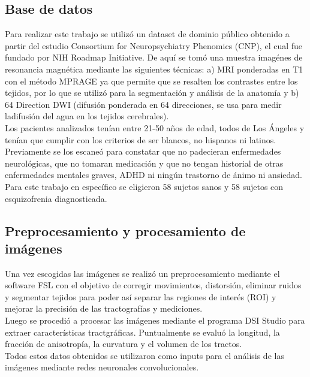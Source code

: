 \subsection{Base de datos}
Para realizar este trabajo se utilizó un dataset de dominio público obtenido a partir del estudio 
Consortium for Neuropsychiatry Phenomics (CNP), el cual fue fundado por NIH Roadmap Initiative. 
De aquí se tomó una muestra imagénes de resonancia magnética mediante las siguientes técnicas: 
a) MRI ponderadas en T1 con el método MPRAGE ya que permite que se resalten los contrastes entre los tejidos, 
por lo que se utilizó para la segmentación y análisis de la anatomía y 
b) 64 Direction DWI (difusión ponderada en 64 direcciones, se usa para medir ladifusión del agua 
en los tejidos cerebrales). \cite{bilder2020ucla}
\\
Los pacientes analizados tenían entre 21-50 años de edad, todos de Los Ángeles y tenían que cumplir 
con los criterios de ser blancos, no hispanos ni latinos. Previamente se los escaneó para constatar 
que no padecieran enfermedades neurológicas, que no tomaran medicación y que no tengan historial de 
otras enfermedades mentales graves, ADHD ni ningún trastorno de ánimo ni ansiedad. \\
Para este trabajo en específico se eligieron 58 sujetos sanos y 58 sujetos con esquizofrenia diagnosticada.

\subsection{Preprocesamiento y procesamiento de imágenes}
Una vez escogidas las imágenes se realizó un preprocesamiento mediante el software FSL con el objetivo de 
corregir movimientos, distorsión, eliminar ruidos y segmentar tejidos para poder así separar las regiones 
de interés (ROI) y mejorar la precisión de las tractografías y mediciones.\\
Luego se procedió a procesar las imágenes mediante el programa DSI Studio para extraer características 
tractgráficas. Puntualmente se evaluó la longitud, la fracción de anisotropía, la curvatura y el volumen 
de los tractos. \\
Todos estos datos obtenidos se utilizaron como inputs para el análisis de las imágenes mediante redes 
neuronales convolucionales.  

